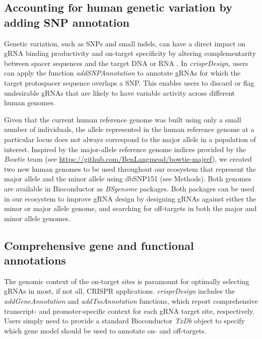 \documentclass[pdftex,english,10pt]{article}
\begin{document}
 
\subsection{Accounting for human genetic variation by adding SNP annotation}

Genetic variation, such as SNPs and small indels, can have a direct impact on gRNA binding productivity and on-target specificity by altering complementarity between spacer sequences and the target DNA or RNA \citep{scott2017implications, lessard2017human, canver2017variant, wang2018genetic}. 
In \textit{crisprDesign}, users can apply the function \textit{addSNPAnnotation} to annotate gRNAs for which the target protospacer sequence overlaps a SNP.
This enables users to discard or flag undesirable gRNAs that are likely to have variable activity across different human genomes.

Given that the current human reference genome was built using only a small number of individuals, the allele represented in the human reference genome at a particular locus does not always correspond to the major allele in a population of interest. Inspired by the major-allele reference genome indices provided by the \textit{Bowtie} team (see \url{https://github.com/BenLangmead/bowtie-majref}), we created two new human genomes to be used throughout our ecosystem that represent the major allele and the minor allele using dbSNP151 (see Methods). Both genomes are available in Bioconductor as \textit{BSgenome} packages. Both packages can be used in our ecosystem to improve gRNA design by designing gRNAs against either the minor or major allele genome, and searching for off-targets in both the major and minor allele genomes. 





\subsection{Comprehensive gene and functional annotations}

The genomic context of the on-target sites is paramount for optimally selecting gRNAs in most, if not all, CRISPR applications. 
\textit{crisprDesign} includes the \textit{addGeneAnnotation} and \textit{addTssAnnotation} functions, which 
report comprehensive transcript- and promoter-specific context for each gRNA target site, respectively. 
Users simply need to provide a standard Bioconductor \textit{TxDb} object to specify which gene model should be used to annotate on- and off-targets.
\end{document}
